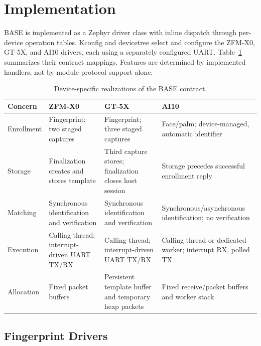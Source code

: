 \section{Implementation}
\label{sec:implementation}

BASE is implemented as a Zephyr driver class with inline dispatch through per-device operation tables. Kconfig and devicetree select and configure the ZFM-X0, GT-5X, and AI10 drivers, each using a separately configured UART. Table~\ref{tab:protocol_comparison} summarizes their contract mappings. Features are determined by implemented handlers, not by module protocol support alone.

\begin{table}[!t]
\centering
\caption{Device-specific realizations of the BASE contract.}
\label{tab:protocol_comparison}
\small
\renewcommand{\arraystretch}{1.15}
\setlength{\tabcolsep}{4pt}
\begin{tabularx}{\textwidth}{|>{\raggedright\arraybackslash}p{}|>{\raggedright\arraybackslash}X|>{\raggedright\arraybackslash}X|>{\raggedright\arraybackslash}X|}
\hline
\textbf{Concern} & \textbf{ZFM-X0} & \textbf{GT-5X} & \textbf{AI10} \\ \hline
Enrollment & Fingerprint; two staged captures & Fingerprint; three staged captures & Face/palm; device-managed, automatic identifier \\ \hline
Storage & Finalization creates and stores template & Third capture stores; finalization closes host session & Storage precedes successful enrollment reply \\ \hline
Matching & Synchronous identification and verification & Synchronous identification and verification & Synchronous/asynchronous identification; no verification \\ \hline
Execution & Calling thread; interrupt-driven UART TX/RX & Calling thread; interrupt-driven UART TX/RX & Calling thread or dedicated worker; interrupt RX, polled TX \\ \hline
Allocation & Fixed packet buffers & Persistent template buffer and temporary heap packets & Fixed receive/packet buffers and worker stack \\ \hline
\end{tabularx}
\end{table}

\subsection{Fingerprint Drivers}

